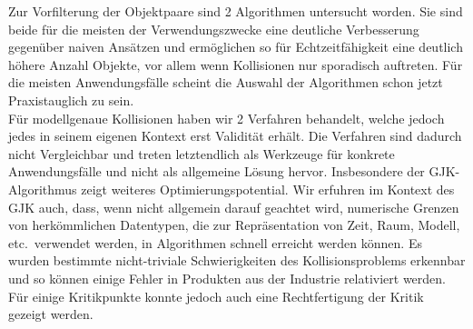 

Zur Vorfilterung der Objektpaare sind 2 Algorithmen untersucht worden. Sie sind beide für die meisten der Verwendungszwecke  eine deutliche Verbesserung gegenüber naiven Ansätzen und ermöglichen so für Echtzeitfähigkeit eine deutlich höhere Anzahl Objekte, vor allem wenn Kollisionen nur sporadisch auftreten. Für die meisten Anwendungsfälle scheint die Auswahl der Algorithmen schon jetzt Praxistauglich zu sein.\\
Für modellgenaue Kollisionen haben wir 2 Verfahren behandelt, welche jedoch jedes in seinem eigenen Kontext erst Validität erhält. Die Verfahren sind dadurch nicht Vergleichbar und treten letztendlich als Werkzeuge für konkrete Anwendungsfälle und nicht als allgemeine Lösung hervor. Insbesondere der GJK-Algorithmus zeigt weiteres Optimierungspotential. Wir erfuhren im Kontext des GJK auch, dass, wenn nicht allgemein darauf geachtet wird, numerische Grenzen von herkömmlichen Datentypen, die zur Repräsentation von Zeit, Raum, Modell, etc.~verwendet werden, in Algorithmen schnell erreicht werden können.
Es wurden bestimmte nicht-triviale Schwierigkeiten des Kollisionsproblems erkennbar und so können einige Fehler in Produkten aus der Industrie relativiert werden. Für einige Kritikpunkte konnte jedoch auch eine Rechtfertigung der Kritik gezeigt werden.
